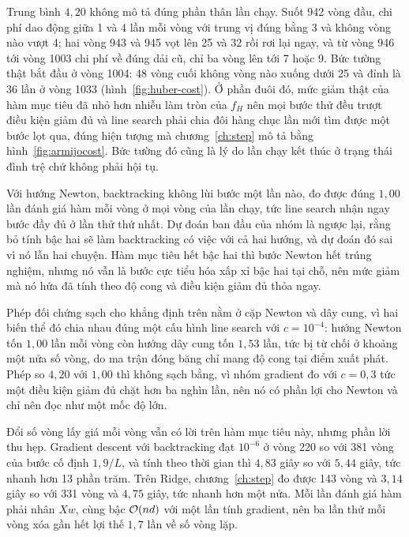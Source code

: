 \documentclass[12pt, a4paper, oneside]{report}
\theoremstyle{definition}
\begin{document}
Trung bình $4{,}20$ không mô tả đúng phần thân lần chạy. Suốt 942 vòng đầu, chi
phí dao động giữa 1 và 4 lần mỗi vòng với trung vị đúng bằng 3 và không vòng nào
vượt 4; hai vòng 943 và 945 vọt lên 25 và 32 rồi rơi lại ngay, và từ vòng 946 tới
vòng 1003 chi phí về đúng dải cũ, chỉ ba vòng lên tới 7 hoặc 9. Bức tường thật bắt
đầu ở vòng 1004: 48 vòng cuối không vòng nào xuống dưới 25 và đỉnh là 36 lần ở
vòng 1033 (hình~\ref{fig:huber-cost}). Ở phần đuôi đó, mức giảm thật của hàm
mục tiêu đã nhỏ hơn nhiễu làm tròn của $f_{H}$ nên mọi bước thử đều trượt điều
kiện giảm đủ và line search phải chia đôi hàng chục lần mới tìm được một bước lọt
qua, đúng hiện tượng mà chương~\ref{ch:step} mô tả bằng hình~\ref{fig:armijocost}.
Bức tường đó cũng là lý do lần chạy kết thúc ở trạng thái đình trệ chứ không phải
hội tụ.


Với hướng Newton, backtracking không lùi bước một lần nào, đo được đúng $1{,}00$
lần đánh giá hàm mỗi vòng ở mọi vòng của lần chạy, tức line search nhận ngay bước
đầy đủ ở lần thử thứ nhất. Dự đoán ban đầu của nhóm là ngược lại, rằng bỏ tính bậc hai sẽ làm
backtracking có việc với cả hai hướng, và dự đoán đó sai vì nó lẫn hai chuyện. Hàm
mục tiêu hết bậc hai thì bước Newton hết trúng nghiệm, nhưng nó vẫn là bước cực
tiểu hóa xấp xỉ bậc hai tại chỗ, nên mức giảm mà nó hứa đã tính theo độ cong và
điều kiện giảm đủ thỏa ngay.

Phép đối chứng sạch cho khẳng định trên nằm ở cặp Newton và dây cung, vì hai biến
thể đó chia nhau đúng một cấu hình line search với $c = 10^{-4}$: hướng Newton tốn
$1{,}00$ lần mỗi vòng còn hướng dây cung tốn $1{,}53$ lần, tức bị từ chối ở khoảng
một nửa số vòng, do ma trận đóng băng chỉ mang độ cong tại điểm xuất phát. Phép so
$4{,}20$ với $1{,}00$ thì không sạch bằng, vì nhóm gradient đo với $c = 0{,}3$ tức
một điều kiện giảm đủ chặt hơn ba nghìn lần, nên nó có phần lợi cho Newton và chỉ
nên đọc như một mốc độ lớn.

Đổi số vòng lấy giá mỗi vòng vẫn có lời trên hàm mục tiêu này, nhưng phần lời thu
hẹp. Gradient descent với backtracking đạt $10^{-6}$ ở vòng 220 so với 381 vòng
của bước cố định $1{,}9/L$, và tính theo thời gian thì $4{,}83$ giây so với
$5{,}44$ giây, tức nhanh hơn 13 phần trăm. Trên Ridge, chương~\ref{ch:step} đo
được 143 vòng và $3{,}14$ giây so với 331 vòng và $4{,}75$ giây, tức nhanh hơn một
nửa. Mỗi lần đánh giá hàm phải nhân $X w$, cùng bậc $\mathcal{O}(nd)$ với một lần tính
gradient, nên ba lần thử mỗi vòng xóa gần hết lợi thế $1{,}7$ lần về số vòng lặp.
\end{document}
